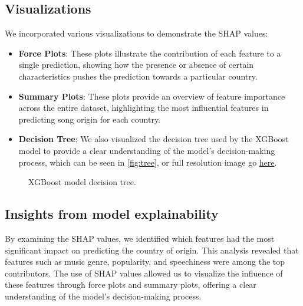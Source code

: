 \documentclass{article}
\begin{document}
\subsection{Visualizations}
We incorporated various visualizations to demonstrate the SHAP values:
\begin{itemize}
    \item \textbf{Force Plots}: These plots illustrate the contribution of each feature to a single prediction, showing how the presence or absence of certain characteristics pushes the prediction towards a particular country.
    \item \textbf{Summary Plots}: These plots provide an overview of feature importance across the entire dataset, highlighting the most influential features in predicting song origin for each country.
    \item \textbf{Decision Tree}: We also visualized the decision tree used by the XGBoost model to provide a clear understanding of the model's decision-making process, which can be seen in \autoref{fig:tree}, or full resolution image go \href{https://raw.githubusercontent.com/FerranAD/songmap/main/images/xgb_tree.png}{here}.
\end{itemize}

\begin{figure}[H]
    \centering
    \noindent
    \caption{XGBoost model decision tree.}
    \label{fig:tree}
\end{figure}

\subsection{Insights from model explainability}
By examining the SHAP values, we identified which features had the most significant impact on predicting the country of origin. This analysis revealed that features such as music genre, popularity, and speechiness were among the top contributors. The use of SHAP values allowed us to visualize the influence of these features through force plots and summary plots, offering a clear understanding of the model's decision-making process.\newline
\end{document}
